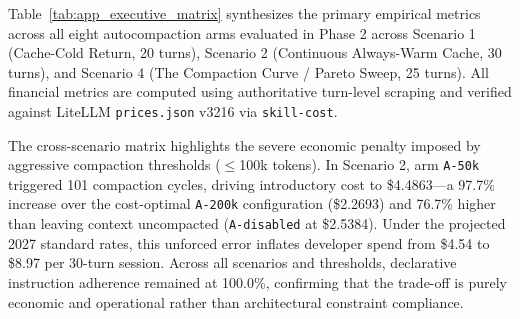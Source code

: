 \documentclass[10pt,twocolumn,a4paper]{article}
\begin{document}
Table~\ref{tab:app_executive_matrix} synthesizes the primary empirical metrics across all eight autocompaction arms evaluated in Phase 2 across Scenario 1 (Cache-Cold Return, 20 turns), Scenario 2 (Continuous Always-Warm Cache, 30 turns), and Scenario 4 (The Compaction Curve / Pareto Sweep, 25 turns). All financial metrics are computed using authoritative turn-level scraping and verified against LiteLLM \texttt{prices.json} v3216 via \texttt{skill-cost}.

The cross-scenario matrix highlights the severe economic penalty imposed by aggressive compaction thresholds ($\le$100k tokens). In Scenario 2, arm \texttt{A-50k} triggered 101 compaction cycles, driving introductory cost to \$4.4863—a 97.7\% increase over the cost-optimal \texttt{A-200k} configuration (\$2.2693) and 76.7\% higher than leaving context uncompacted (\texttt{A-disabled} at \$2.5384). Under the projected 2027 standard rates, this unforced error inflates developer spend from \$4.54 to \$8.97 per 30-turn session. Across all scenarios and thresholds, declarative instruction adherence remained at 100.0\%, confirming that the trade-off is purely economic and operational rather than architectural constraint compliance.
\end{document}

